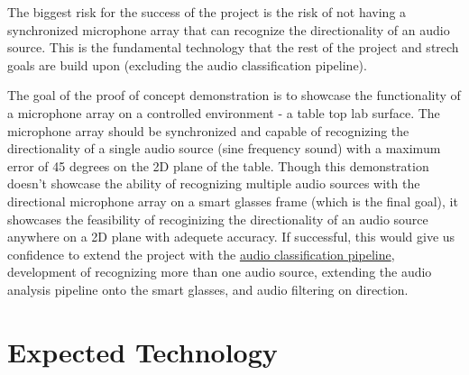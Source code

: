 \documentclass{article}
\begin{document}
\hspace{1cm}

The biggest risk for the success of the project is the risk of not having a synchronized microphone array that can recognize the directionality of an audio source.
This is the fundamental technology that the rest of the project and strech goals are build upon (excluding the audio classification pipeline).

The goal of the proof of concept demonstration is to showcase the functionality of a microphone array on a controlled environment - a table top lab surface.
The microphone array should be synchronized and capable of recognizing the directionality of a single audio source (sine frequency sound) with a maximum error of 45 degrees on the 2D plane of the table.
Though this demonstration doesn't showcase the ability of recognizing multiple audio sources with the directional microphone array on a smart glasses frame (which is the final goal), it showcases the feasibility of recoginizing the directionality of an audio source anywhere on a 2D plane with adequete accuracy.
If successful, this would give us confidence to extend the project with the \hyperlink{audio_classification_pipeline}{audio classification pipeline}, development of recognizing more than one audio source, extending the audio analysis pipeline onto the smart glasses, and audio filtering on direction. 

\section{Expected Technology}


\end{document}
